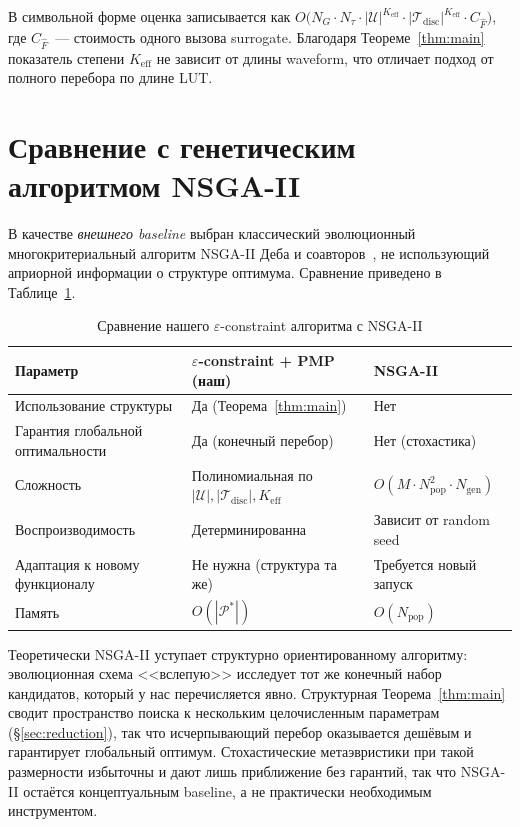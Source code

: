 В символьной форме оценка записывается как $O\bigl(N_G \cdot N_{\tau} \cdot
|\mathcal{U}|^{K_{\mathrm{eff}}} \cdot |\mathcal{T}_{\mathrm{disc}}|^{K_{\mathrm{eff}}}
\cdot C_{\widehat{F}}\bigr)$, где $C_{\widehat{F}}$~--- стоимость одного
вызова surrogate. Благодаря Теореме~\ref{thm:main} показатель степени
$K_{\mathrm{eff}}$ не зависит от длины waveform, что отличает подход от
полного перебора по длине LUT.


\section{Сравнение с генетическим алгоритмом NSGA-II}\label{sec:nsga2-comparison}

В качестве \emph{внешнего baseline} выбран классический эволюционный
многокритериальный алгоритм NSGA-II Деба и
соавторов~\cite{deb2002_nsga2}, не использующий априорной информации о
структуре оптимума. Сравнение приведено в
Таблице~\ref{tab:algorithm-complexity}.

\begin{table}[ht]
    \centering
    \caption{Сравнение нашего $\varepsilon$-constraint
        алгоритма с NSGA-II}\label{tab:algorithm-complexity}
    \footnotesize
    \begin{tabularx}{\textwidth}{lXX}
        \hline
        Параметр & $\varepsilon$-constraint + PMP (наш) & NSGA-II~\cite{deb2002_nsga2} \\
        \hline
        Использование структуры & Да (Теорема~\ref{thm:main}) & Нет \\
        Гарантия глобальной оптимальности & Да (конечный перебор) & Нет (стохастика) \\
        Сложность & Полиномиальная по
            $|\mathcal{U}|, |\mathcal{T}_{\mathrm{disc}}|, K_{\mathrm{eff}}$ &
            $O(M \cdot N_{\mathrm{pop}}^2 \cdot N_{\mathrm{gen}})$ \\
        Воспроизводимость & Детерминированна & Зависит от random seed \\
        Адаптация к новому функционалу & Не нужна (структура та же) &
            Требуется новый запуск \\
        Память & $O(|\mathcal{P}^{*}|)$ & $O(N_{\mathrm{pop}})$ \\
        \hline
    \end{tabularx}
\end{table}

Теоретически NSGA-II уступает структурно ориентированному алгоритму:
эволюционная схема <<вслепую>> исследует тот же конечный набор кандидатов,
который у нас перечисляется явно. Структурная Теорема~\ref{thm:main} сводит
пространство поиска к нескольким целочисленным параметрам
(\S\ref{sec:reduction}), так что исчерпывающий перебор оказывается дешёвым и
гарантирует глобальный оптимум. Стохастические метаэвристики при такой
размерности избыточны и дают лишь приближение без гарантий, так что NSGA-II
остаётся концептуальным baseline, а не практически необходимым инструментом.

